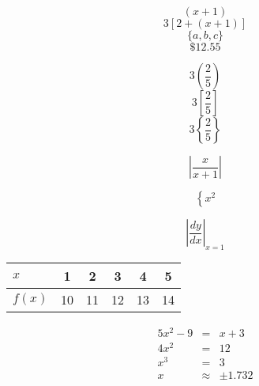 \documentclass[11pt]{article}
\begin{document}
$$(x+1)$$
$$3[2+(x+1)]$$
$$\{a,b,c\}$$
$$\$12.55$$

$$3\left(\frac{2}{5}\right)$$
$$3\left[\frac{2}{5}\right]$$
$$3\left\{\frac{2}{5}\right\}$$

$$\left|\frac{x}{x+1}\right|$$

$$\left\{x^2\right.$$

$$\left|\frac{dy}{dx}\right|_{x=1}$$

\begin{tabular}{|l|c|c|c|c|c|}
\hline
$x$ & 1 & 2 & 3 & 4 & 5\\\hline
$f(x)$ & 10 & 11 & 12 & 13 & 14 \\ \hline
\end{tabular}

\begin{eqnarray*}
5x^2-9&=&x+3\\
4x^2&=&12\\
x^3&=&3\\
x&\approx&\pm1.732
\end{eqnarray*}

 
\end{document}
